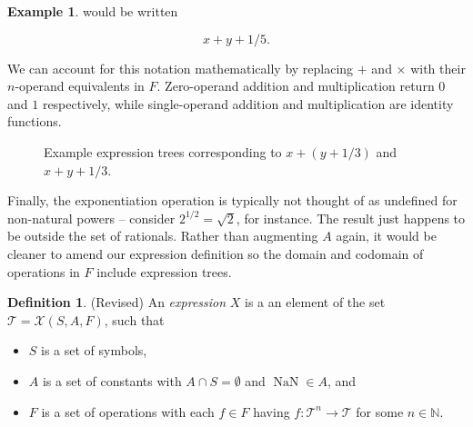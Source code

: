 \documentclass{article}
\theoremstyle{definition}
\newtheorem{defin}[thm]{Definition}
\newtheorem{exa}[thm]{Example}
\DeclareMathOperator{\NaN}{NaN}
\begin{document}
\begin{exa}
    would be written
    
    \begin{equation*}
        x + y + 1/5.
    \end{equation*}
    
    We can account for this notation mathematically by replacing $+$ and $\times$ with their $n$-operand equivalents in $F$. Zero-operand addition and multiplication return $0$ and $1$ respectively, while single-operand addition and multiplication are identity functions.
    
    \begin{figure}[H]
    \centering
    \caption{Example expression trees corresponding to $x + (y + 1/3)$ and $x + y + 1/3$. \label{fig:1}}
    \end{figure}
    
    Finally, the exponentiation operation is typically not thought of as undefined for non-natural powers -- consider $2^{1/2} = \sqrt{2}$, for instance. The result just happens to be outside the set of rationals. Rather than augmenting $A$ again, it would be cleaner to amend our expression definition so the domain and codomain of operations in $F$ include expression trees. 
\end{exa}

\begin{defin}
    (Revised) An \emph{expression} $X$ is a an element of the set $\mathcal{T} = \mathcal{X}(S,A,F)$, such that
    \begin{itemize}
                \item $S$ is a set of symbols,
    \item $A$ is a set of constants with $A \cap S = \emptyset$ and $\NaN \in A$, and
    \item $F$ is a set of operations with each $f \in F$ having $f: \mathcal{T}^n \to \mathcal{T}$ for some $n \in \mathbb{N}$.
    \end{itemize}
\end{defin}
\end{document}
